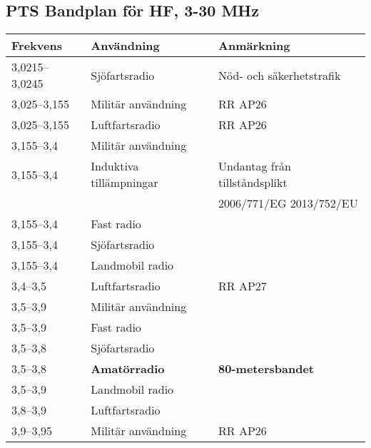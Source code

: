 \begin{landscape}
\subsection{PTS Bandplan för HF, 3-30 MHz}
\begin{longtable}{lll}
\textbf{Frekvens} & \textbf{Användning}              & \textbf{Anmärkning}             \\ \hline \endhead
3,0215--3,0245    & Sjöfartsradio                    & Nöd- och säkerhetstrafik        \\
3,025--3,155      & Militär användning               & RR AP26                         \\
3,025--3,155      & Luftfartsradio                   & RR AP26                         \\
3,155--3,4        & Militär användning               &                                 \\
3,155--3,4        & Induktiva tillämpningar          & Undantag från tillståndsplikt   \\ 
                  &                                  & 2006/771/EG 2013/752/EU         \\
3,155--3,4        & Fast radio                       &                                 \\
3,155--3,4        & Sjöfartsradio                    &                                 \\
3,155--3,4        & Landmobil radio                  &                                 \\
3,4--3,5          & Luftfartsradio                   & RR AP27                         \\
3,5--3,9          & Militär användning               &                                 \\	 
3,5--3,9          & Fast radio                       &                                 \\
3,5--3,8          & Sjöfartsradio                    &                                 \\
3,5--3,8          & \textbf{Amatörradio}             & \textbf{80-metersbandet}        \\
3,5--3,9          & Landmobil radio                  &                                 \\
3,8--3,9          & Luftfartsradio                   &                                 \\
3,9--3,95         & Militär användning               & RR AP26                         \\

\end{longtable}
\end{landscape}

